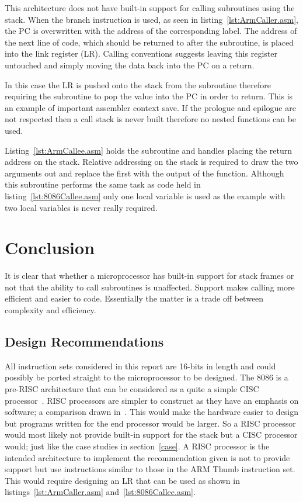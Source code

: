 \documentclass[12pt,a4paper]{article}
\begin{document}
This architecture does not have built-in support for calling subroutines using the stack.
When the branch instruction is used, as seen in listing~\ref{lst:ArmCaller.asm}, the PC is overwritten with the address of the corresponding label.
The address of the next line of code, which should be returned to after the subroutine, is placed into the link register (LR).
Calling conventions suggests leaving this register untouched and simply moving the data back into the PC on a return.
\newpage


In this case the LR is pushed onto the stack from the subroutine therefore requiring the subroutine to pop the value into the PC in order to return.
This is an example of important assembler context save.
If the prologue and epilogue are not respected then a call stack is never built therefore no nested functions can be used.

Listing~\ref{lst:ArmCallee.asm} holds the subroutine and handles placing the return address on the stack.
Relative addressing on the stack is required to draw the two arguments out and replace the first with the output of the function.
Although this subroutine performs the same task as code held in listing~\ref{lst:8086Callee.asm} only one local variable is used as the example with two local variables is never really required.


\section{Conclusion}

It is clear that whether a microprocessor has built-in support for stack frames or not that the ability to call subroutines is unaffected.
Support makes calling more efficient and easier to code.
Essentially the matter is a trade off between complexity and efficiency.

\subsection{Design Recommendations}
All instruction sets considered in this report are 16-bits in length and could possibly be ported straight to the microprocessor to be designed.
The 8086 is a pre-RISC architecture that can be considered as a quite a simple CISC processor~\cite{brief}.
RISC processors are simpler to construct as they have an emphasis on software; a comparison drawn in~\cite{CISCvRISC}. 
This would make the hardware easier to design but programs written for the end processor would be larger. 
So a RISC processor would most likely not provide built-in support for the stack but a CISC processor would; just like the case studies in section~\ref{case}.
A RISC processor is the intended architecture to implement the recommendation given is not to provide support but use instructions similar to those in the ARM Thumb instruction set. 
This would require designing an LR that can be used as shown in listings~\ref{lst:ArmCaller.asm} and~\ref{lst:8086Callee.asm}. 
\end{document}
